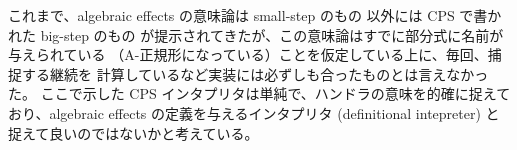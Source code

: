 これまで、algebraic effects の意味論は small-step のもの
\cite{10.1145/2500365.2500590, PRETNAR201519}
以外には
CPS で書かれた big-step のもの
\cite{e6cb0c3222794e48bf38cf44e46fe4aa}
が提示されてきたが、この意味論はすでに部分式に名前が与えられている
（A-正規形になっている）ことを仮定している上に、毎回、捕捉する継続を
計算しているなど実装には必ずしも合ったものとは言えなかった。
ここで示した CPS インタプリタは単純で、ハンドラの意味を的確に捉えて
おり、algebraic effects の定義を与えるインタプリタ (definitional
intepreter) と捉えて良いのではないかと考えている。


